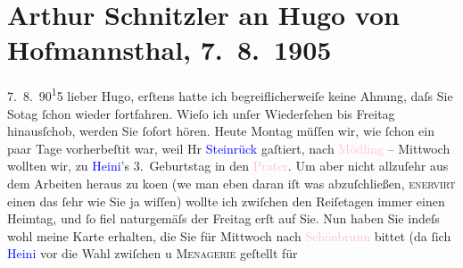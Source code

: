 

               \section[Arthur Schnitzler an Hugo von Hofmannsthal, 7. 8. 1905]{ Arthur Schnitzler an Hugo von Hofmannsthal, 7. 8. 1905}\nopagebreak{}\rehead{ }\normalsize\beginnumbering{} \toendnotes[C]{\smallbreak\pagebreak[2]} 
\toendnotes[C]{\smallbreak}\pstart
           \raggedleft{}{\pb}7. 8. 90\substVorne{}\textsuperscript{1}\substDazwischen{}5\substHinten{}\pend
           \pstart
           lieber Hugo, erſtens hatte ich begreiflicherweiſe keine Ahnung, daſs
               Sie So{\geminationn}tag{ }ſchon  wieder
               fortfahren. Wieſo ich unſer Wiederſehen bis Freitag hinausſchob, werden Sie ſofort
               hören. Heute Montag müſſen wir, wie ſchon ein paar Tage vorherbeſti{\geminationm}t war, weil Hr \textcolor{blue}{Steinrück}{}\ledrightnote{\textcolor{blue}{Albert Steinrück}} gaſtiert, nach \textcolor{pink}{Mödling}{}\ledrightnote{\textcolor{pink}{Mödling}} –
                  Mittwoch wollten {\pb}wir, zu \textcolor{blue}{Heini}{}\ledrightnote{\textcolor{blue}{Heinrich Schnitzler}}’s 3. Geburtstag in den \textcolor{pink}{Prater}{}\ledrightnote{\textcolor{pink}{Prater}}. Um aber nicht allzuſehr aus dem Arbeiten heraus zu ko{\geminationm}en (we{\geminationn} man eben daran iſt
               was abzuſchließen, \textsc{enervirt} einen das ſehr wie Sie ja
               wiſſen) wollte ich zwiſchen den Reiſetagen immer einen Heimtag, und ſo fiel
               naturgemäſs der Freitag erſt auf Sie. {\pb}Nun
               haben Sie indeſs wohl meine Karte erhalten, die Sie für Mittwoch nach
                  \textcolor{pink}{Schönbrunn}{}\ledrightnote{\textcolor{pink}{Schloß Schönbrunn}} bittet (da ſich \textcolor{blue}{Heini}{}\ledrightnote{\textcolor{blue}{Heinrich Schnitzler}} vor die Wahl zwiſchen \label{K_L01540_1v}\label{K_L01540_1h} u \textsc{Menagerie} geſtellt für
